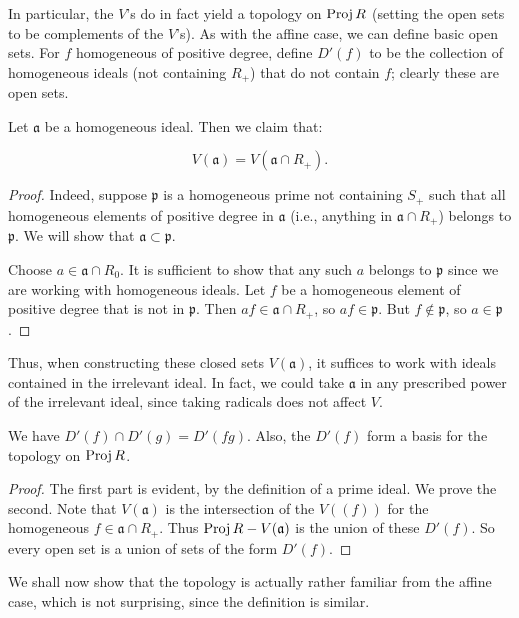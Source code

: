In particular,  the $V$'s do in fact yield a topology on $\operatorname{Proj} R$ (setting
the open sets to be complements of the $V$'s).
As with the affine case, we can define basic open sets. For $f$
homogeneous of positive degree, define $D'(f)$ to be the
collection of homogeneous ideals (not containing $R_+$) that do not contain $f$;
clearly these are
open sets.

Let $\mathfrak{a}$ be a homogeneous ideal. Then we claim that:
\begin{lemma} 
\[  V(\mathfrak{a}) = V(\mathfrak{a} \cap R_+).  \]
\end{lemma} 
\begin{proof} 
Indeed, suppose $\mathfrak{p}$ is a homogeneous prime not containing $S_+$ such
that all homogeneous
elements of positive degree in $\mathfrak{a}$ (i.e., anything in $\mathfrak{a}
\cap R_+$) belongs to $\mathfrak{p}$. We will
show that $\mathfrak{a} \subset \mathfrak{p}$.

Choose $a \in \mathfrak{a} \cap R_0$. It is sufficient to show that any such
$a$ belongs to $\mathfrak{p}$ since we are working with homogeneous ideals.
Let $f$ be a homogeneous element of positive degree that is not in
$\mathfrak{p}$.  Then $af \in \mathfrak{a} \cap R_+$, so $af \in \mathfrak{p}$.
But $f \notin \mathfrak{p}$, so $a \in \mathfrak{p}$.
\end{proof} 

Thus, when constructing these closed sets $V(\mathfrak{a})$, it suffices to
work with ideals contained in the irrelevant ideal. In fact, we could take
$\mathfrak{a}$ in any prescribed power of the irrelevant ideal, since taking
radicals does not affect $V$.

\begin{proposition} 
We have $D'(f) \cap D'(g) = D'(fg)$. Also, the $D'(f)$ form a basis for the
topology on $\operatorname{Proj} R$.
\end{proposition} 
\begin{proof} The first part is evident, by the definition of a prime ideal. We
prove the second.
Note that $V(\mathfrak{a})$ is the intersection of the $V((f))$ for the
homogeneous $f \in
\mathfrak{a} \cap R_+$. Thus $\operatorname{Proj} R - V(\mathfrak{a})$ is the union of these
$D'(f)$.
So every open set is a union of sets of the form $D'(f)$.
\end{proof} 

We shall now 
show that the topology is actually rather familiar from the affine case, which
is not surprising, since the definition is similar.

